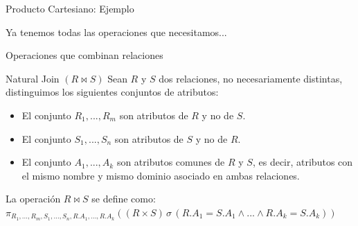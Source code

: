 \begin{frame}{Producto Cartesiano: Ejemplo}
\end{frame}





\begin{frame}{Ya tenemos todas las operaciones que necesitamos...}

\end{frame}


\begin{frame}{Operaciones que combinan relaciones}
    \begin{block}{Natural Join $(R \Join S)$}
        Sean $R$ y $S$ dos relaciones, no necesariamente distintas, distinguimos
        los siguientes conjuntos de atributos:
        \begin{itemize}
            \item El conjunto $R_1,...,R_m$ son atributos de $R$ y no de $S$.
            \item El conjunto $S_1,...,S_n$ son atributos de $S$ y no de $R$.
            \item El conjunto $A_1,...,A_k$ son atributos comunes de $R$ y $S$, es decir, atributos
            con el mismo nombre y mismo dominio asociado en ambas relaciones. 
        \end{itemize}
        La operaci\'on $R \Join S$ se define como:\\[2mm]
        \centering
        $
            \pi_{R_1,...,R_m,S_1,...,S_n,R.A_1,...,R.A_k}((R \times S)  \,\sigma\, (R.A_1 = S.A_1 \land ... \land R.A_k = S.A_k))
        $
    \end{block}

\end{frame}


